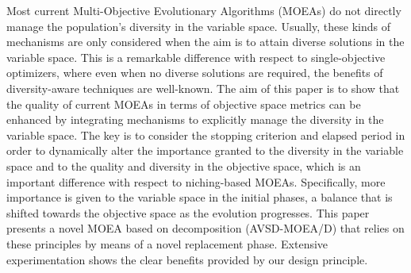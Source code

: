 Most current Multi-Objective Evolutionary Algorithms (MOEAs) do not directly manage 
the population's diversity in the variable space.
%
Usually, these kinds of mechanisms are only considered when the aim is to attain diverse solutions 
in the variable space.
%
This is a remarkable difference with respect to single-objective optimizers, where
even when no diverse solutions are required, the benefits of diversity-aware 
techniques are well-known.
%
The aim of this paper is to show that the quality of current MOEAs in terms of objective space metrics can be
enhanced by integrating mechanisms to explicitly manage the diversity in the variable space.
%
The key is to consider the stopping criterion and elapsed period in order to dynamically alter the importance
granted to the diversity in the variable space and to the quality and diversity in the objective space,
which is an important difference with respect to niching-based MOEAs.
%
Specifically, more importance is given to the variable space in the initial phases, a balance
that is shifted towards the objective space as the evolution progresses.
%
This paper presents a novel MOEA based on decomposition (AVSD-MOEA/D) that relies on these principles by means of a novel replacement phase.
%
Extensive experimentation shows the clear benefits provided by our design principle. 
